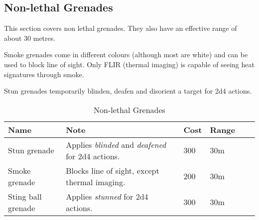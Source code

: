 \subsection{Non-lethal Grenades}

This section covers non lethal grenades. They also have an effective range
of about 30 metres.

Smoke grenades come in different colours (although most are white) and can be
used to block line of sight. Only FLIR (thermal imaging) is capable of seeing
heat signatures through smoke.

Stun grenades temporarily blinden, deafen and disorient a target for 2d4
actions.

\begin{table}
  \caption{Non-lethal Grenades}
  \begin{center}
    \begin{tabular}{| l | l | l | l | l | l |}

      \hline
      \textbf{Name} & \textbf{Note} & \textbf{Cost} & \textbf{Range} \\ \hline

      Stun grenade  & Applies \emph{blinded} and \emph{deafened} for 2d4 actions. & 300 & 30m \\ \hline
      Smoke grenade & Blocks line of sight, except thermal imaging. & 200 & 30m \\ \hline
      Sting ball grenade & Applies \emph{stunned} for 2d4 actions. & 300 & 30m \\ \hline

    \end{tabular}
  \end{center}
\end{table}
